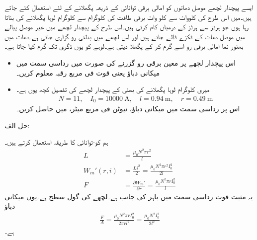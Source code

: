 ایسے پیچدار لچھے موصل دھاتوں کو امالی برقی توانائی کے ذریعہ پگھلانے کے لئے استعمال کئے جاتے ہیں۔میں اس طرح کی   کلوواٹ سے   کلو واٹ برقی طاقت کی   کلوگرام سے   کلوگرام  لوہا پگھلانے کی  بناتا رہا ہوں جو  ہرٹز سے   ہرٹز کے درمیاں کام کرتی ہیں۔اس طرح کے پیچدار لچھے میں غیر موصل پیالے میں موصل دھات کے ٹکڑے ڈالے جاتے ہیں اور اس لچھے میں بدلتی رو گزاری جاتی ہے۔دھات میں بھنور نما امالی برقی رو اسے گرم کر کے پگھلا دیتی ہے۔لوہے کو یوں   ڈگری  تک گرم کیا جاتا ہے۔
\begin{itemize}
\item
اس پیچدار لچھے پر معین برقی رو  گزرنے کی صورت میں رداسی سمت میں میکانی دباؤ یعنی قوت فی مربع رقبہ معلوم کریں۔
\item
میری  کلوگرام لوہا پگھلانے کی بھٹی کے پیچدار لچھے کی تفصیل کچھ یوں ہے۔
\begin{align*}
N=11, \quad I_0=\SI{10000}{\ampere}, \quad l=\SI{0.94}{\meter}, \quad r=\SI{0.49}{\meter}
\end{align*}
اس پر رداسی سمت میں میکانی دباؤ، نیوٹن فی مربع میٹر، میں حاصل کریں۔
\end{itemize}

حل الف:

ہم کو-توانائی کا طریقہ استعمال کرتے ہیں۔
\begin{align*}
L&=\frac{\mu_0 N^2 \pi r^2}{l}\\
W_m'(r,i)&=\frac{L i^2}{2}=\frac{\mu_0 N^2 \pi r^2 I_0^2}{2 l}\\
F&=\frac{\partial W_m'}{\partial r}=\frac{\mu_0 N^2 \pi r I_0^2}{l}
\end{align*}
یہ مثبت قوت رداسی سمت میں باہر کی جانب ہے۔لچھے کی گول سطح   ہے۔یوں میکانی دباؤ
\begin{align*}
\frac{F}{A}=\frac{\mu_0 N^2 \pi r I_0^2}{2\pi r l^2}=\frac{\mu_0 N^2  I_0^2}{2 l^2}
\end{align*}
ہے۔

